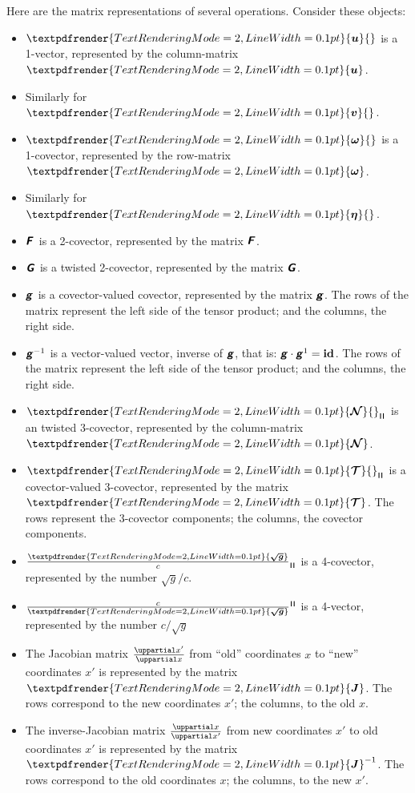 \documentclass[\ifafour a4paper,12pt,\else a5paper,10pt,\fi%
onecolumn,oneside,article,%
british%
]{memoir}
\makeatletter
\theoremstyle{remark}
\theoremstyle{innote}
\newcommand*{\mathte}[1]{\textbf{\textit{\textsf{#1}}}}
\renewcommand*{\bm}[1]{\textpdfrender{TextRenderingMode=2,LineWidth=0.1pt}{\boldsymbol{#1}}}
\newcommand*{\de}{\uppartial}%
\renewcommand*{\|}[1][]{\nonscript\:#1\vert\nonscript\:\mathopen{}}
\newcommand*{\id}{\mathbf{id}}%
\renewcommand*{\i}{{}\indices}
\newcommand*{\q}{}%
\DeclareRobustCommand*{\q}{%
  \mathord{\mathpalette\bigcdot@{}}%
}
\newcommand*{\bigcdot@scalefactor}{0.7}
\newcommand*{\bigcdot@widthfactor}{1.5}
\newcommand*{\bigcdot@}[2]{%
  \sbox0{$#1\vcenter{}$}%
  \sbox2{$#1\cdot\m@th$}%
  \hbox to \bigcdot@widthfactor\wd2{%
    \hfil
    \raise\ht0\hbox{%
      \scalebox{\bigcdot@scalefactor}{%
        \lower\ht0\hbox{$#1\bullet\m@th$}%
      }%
    }%
    \hfil
  }%
}
\newcommand*{\rul}{{\mkern2mu\rule[-0.1ex]{0.75pt}{1.1ex}\mkern2mu}}
\DeclarePairedDelimiter\mul{\rul}{\rul}%
\newcommand*{\yg}{\mathte{g}}
\newcommand*{\dg}{\sqrt{g}}
\newcommand*{\ve}{\tfrac{\bm{\sqrt{g}}}{c}}
\newcommand*{\vi}{\tfrac{c}{\bm{\sqrt{g}}}}
\newcommand*{\yN}{\bm{\mathcal{N}}}
\newcommand*{\yTT}{\bm{\mathcal{T}}}
\newcommand*{\yu}{\bm{u}}
\newcommand*{\yv}{\bm{v}}
\newcommand*{\yo}{\bm{\omega}}
\newcommand*{\yh}{\bm{\eta}}
\newcommand*{\yJ}{\bm{J}}
\newcommand*{\yF}{\mathte{F}}
\newcommand*{\yG}{\mathte{G}}
\makeatother
\begin{document}
Here are the matrix representations of several operations. Consider these objects:
\begin{itemize}
\item $\yu\i{^{\q}}$ is a 1-vector, represented by the column-matrix $\yu$.
\item Similarly for $\yv\i{^{\q}}$.
\item $\yo\i{_{\q}}$ is a 1-covector, represented by the row-matrix $\yo$.
\item Similarly for $\yh\i{_{\q}}$.
\item $\yF\i{_{\q\q}}$ is a 2-covector, represented by the matrix $\yF$.
\item $\yG\i{_{\q\q}}$ is a twisted 2-covector, represented by the matrix $\yG$.
\item $\yg\i{_{\q\q}}$ is a covector-valued covector, represented by the matrix $\yg$. The rows of the matrix represent the left side of the tensor product; and the columns, the right side.
\item ${\yg^{-1}}\i{^{\q\q}}$ is a vector-valued vector, inverse of $\yg$, that is: $\yg\cdot\yg^{1} = \id\i{_{\q}^{\q}}$. The rows of the matrix represent the left side of the tensor product; and the columns, the right side.

\item $\yN\i{_{\mul{\q\q\q}}}$ is an twisted 3-covector, represented by the column-matrix $\yN$.

\item $\yTT\i{_{\mul{\q\q\q}\q}}$ is a covector-valued 3-covector, represented by the matrix $\yTT$. The rows represent the 3-covector components; the columns, the covector components.
\item $\ve\i{_{\mul{\q\q\q\q}}}$ is a 4-covector, represented by the number $\dg/c$.
\item ${\vi}\i{^{\mul{\q\q\q\q}}}$ is a 4-vector, represented by the number $c/\dg$
\item The Jacobian matrix $\frac{\de x'}{\de x}$ from \enquote{old} coordinates $x$ to \enquote{new} coordinates $x'$ is represented by the matrix $\yJ$. The rows correspond to the new coordinates $x'$; the columns, to the old $x$.

\item The inverse-Jacobian matrix $\frac{\de x}{\de x'}$ from new coordinates $x'$ to old coordinates $x'$ is represented by the matrix $\yJ^{-1}$. The rows correspond to the old coordinates $x$; the columns, to the new $x'$.
\end{itemize}
\end{document}
